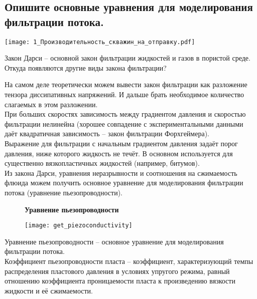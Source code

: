 

\subsection{Опишите основные уравнения для моделирования фильтрации потока.}

\texttt{[image: 1\_Производительность\_скважин\_на\_отправку.pdf]}

Закон Дарси -- основной закон фильтрации жидкостей и газов в пористой среде.
\\

Откуда появляются другие виды закона фильтрации?

На самом деле теоретически можем вывести закон фильтрации как разложение тензора диссипативных напряжений.
И дальше брать необходимое количество слагаемых в этом разложении.
\\

При больших скоростях зависимость между градиентом давления и скоростью фильтрации нелинейна (хорошее совпадение с экспериментальными данными даёт квадратичная зависимость -- закон фильтрации Форхгеймера).
\\

Выражение для фильтрации с начальным градиентом давления задаёт порог давления, ниже которого жидкость не течёт.
В основном используется для существенно вязкопластичных жидкостей (например, битумов).
\\

Из закона Дарси, уравнения неразрывности и соотношения на сжимаемость флюида можем получить основное уравнение для моделирования фильтрации потока (уравнение пьезопроводности).

\begin{figure}[H]
\textbf{Уравнение пьезопроводности}

\texttt{[image: get\_piezoconductivity]}
\end{figure}

Уравнение пьезопроводности -- основное уравнение для моделирования фильтрации потока.
\\

Коэффициент пьезопроводности пласта -- коэффициент, характеризующий темпы распределения пластового давления в условиях упругого режима, равный отношению коэффициента проницаемости пласта к произведению вязкости жидкости и её сжимаемости.

